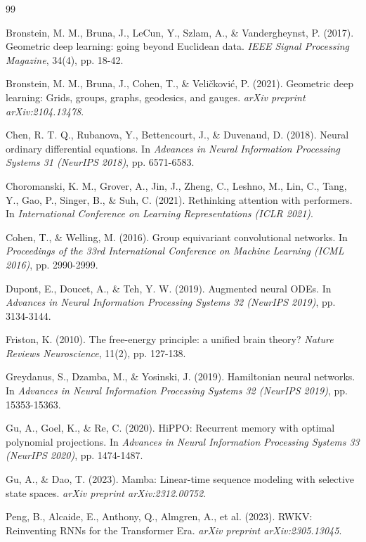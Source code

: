 \documentclass[12pt,a4paper]{article}
\begin{document}
\begin{thebibliography}{99}

Bronstein, M. M., Bruna, J., LeCun, Y., Szlam, A., \& Vandergheynst, P. (2017). Geometric deep learning: going beyond Euclidean data. \textit{IEEE Signal Processing Magazine}, 34(4), pp. 18-42.

Bronstein, M. M., Bruna, J., Cohen, T., \& Veličković, P. (2021). Geometric deep learning: Grids, groups, graphs, geodesics, and gauges. \textit{arXiv preprint arXiv:2104.13478}.

Chen, R. T. Q., Rubanova, Y., Bettencourt, J., \& Duvenaud, D. (2018). Neural ordinary differential equations. In \textit{Advances in Neural Information Processing Systems 31 (NeurIPS 2018)}, pp. 6571-6583.

Choromanski, K. M., Grover, A., Jin, J., Zheng, C., Leshno, M., Lin, C., Tang, Y., Gao, P., Singer, B., \& Suh, C. (2021). Rethinking attention with performers. In \textit{International Conference on Learning Representations (ICLR 2021)}.

Cohen, T., \& Welling, M. (2016). Group equivariant convolutional networks. In \textit{Proceedings of the 33rd International Conference on Machine Learning (ICML 2016)}, pp. 2990-2999.

Dupont, E., Doucet, A., \& Teh, Y. W. (2019). Augmented neural ODEs. In \textit{Advances in Neural Information Processing Systems 32 (NeurIPS 2019)}, pp. 3134-3144.

Friston, K. (2010). The free-energy principle: a unified brain theory? \textit{Nature Reviews Neuroscience}, 11(2), pp. 127-138.

Greydanus, S., Dzamba, M., \& Yosinski, J. (2019). Hamiltonian neural networks. In \textit{Advances in Neural Information Processing Systems 32 (NeurIPS 2019)}, pp. 15353-15363.

Gu, A., Goel, K., \& Re, C. (2020). HiPPO: Recurrent memory with optimal polynomial projections. In \textit{Advances in Neural Information Processing Systems 33 (NeurIPS 2020)}, pp. 1474-1487.

Gu, A., \& Dao, T. (2023). Mamba: Linear-time sequence modeling with selective state spaces. \textit{arXiv preprint arXiv:2312.00752}.

Peng, B., Alcaide, E., Anthony, Q., Almgren, A., et al. (2023). RWKV: Reinventing RNNs for the Transformer Era. \textit{arXiv preprint arXiv:2305.13045}.


\end{thebibliography}
\end{document}
